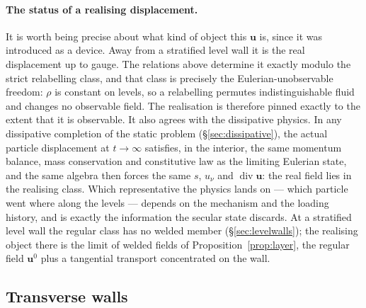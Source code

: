 \documentclass[11pt]{article}
\theoremstyle{definition}
\theoremstyle{remark}
\newcommand{\bu}{\mathbf{u}}
\newcommand{\Div}{\operatorname{div}}
\begin{document}
\paragraph{The status of a realising displacement.} It is worth being
precise about what kind of object this $\bu$ is, since it was
introduced as a device. Away from a stratified level wall it is the
real displacement up to gauge. The relations above determine it
exactly modulo the strict relabelling class, and that class is
precisely the Eulerian-unobservable freedom: $\rho$ is constant on
levels, so a relabelling permutes indistinguishable fluid and changes
no observable field. The realisation is therefore pinned exactly to
the extent that it is observable. It also agrees with the dissipative
physics. In any dissipative completion of the static problem
(\S\ref{sec:dissipative}), the actual particle displacement at $t \to
\infty$ satisfies, in the interior, the same momentum balance, mass
conservation and constitutive law as the limiting Eulerian state, and
the same algebra then forces the same $s$, $u_\nu$ and $\Div\bu$: the
real field lies in the realising class. Which representative the
physics lands on --- which particle went where along the levels ---
depends on the mechanism and the loading history, and is exactly the
information the secular state discards. At a stratified level wall the
regular class has no welded member (\S\ref{sec:levelwalls}); the
realising object there is the limit of welded fields of
Proposition~\ref{prop:layer}, the regular field $\bu^0$ plus a
tangential transport concentrated on the wall.

\subsection{Transverse walls}
\label{sec:transverse}
\end{document}
